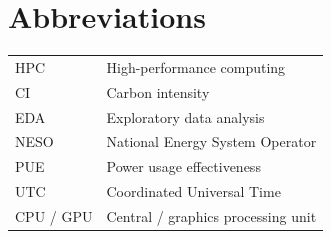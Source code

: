 \chapter{Abbreviations}
\label{app:abbreviations}
\begin{tabular}{ll}
HPC & High-performance computing\\
CI & Carbon intensity\\
EDA & Exploratory data analysis\\
NESO & National Energy System Operator\\
PUE & Power usage effectiveness\\
UTC & Coordinated Universal Time\\
CPU / GPU & Central / graphics processing unit\\
\end{tabular}
